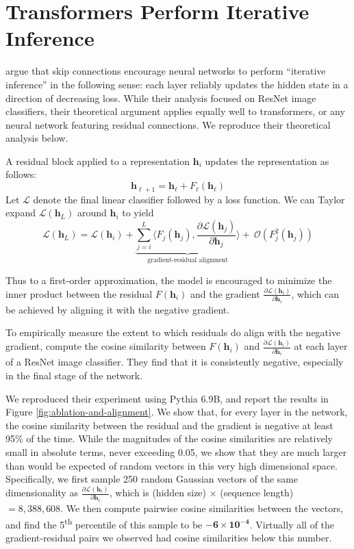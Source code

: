\documentclass{article}
\theoremstyle{plain}
\theoremstyle{definition}
\newcommand{\hh}{\boldsymbol h} %
\begin{document}
\section{Transformers Perform Iterative Inference}
\label{app:iterative-inference}

\citet{jastrzkebski2017residual} argue that skip connections encourage neural networks to perform ``iterative inference'' in the following sense: each layer reliably updates the hidden state in a direction of decreasing loss. While their analysis focused on ResNet image classifiers, their theoretical argument applies equally well to transformers, or any neural network featuring residual connections. We reproduce their theoretical analysis below.

A residual block applied to a representation $ \hh_{i} $ updates the representation as follows:
\begin{equation*}
 \hh_{\ell+1}  = \hh_{\ell} + F_{\ell}(\hh_{\ell})
\end{equation*}
Let $\mathcal{L}$ denote the final linear classifier followed by a loss function. We can Taylor expand $\mathcal{L}(\hh_L)$ around $\hh_i$ to yield
\begin{equation}
    \mathcal{L}(\hh_L) = \mathcal{L}(\hh_{i}) + \underbrace{\sum_{j=i}^{L} \Big\langle F_{j}(\hh_{j}), \frac{\partial \mathcal{L}(\hh_{j})}{\partial \hh_{j}} \Big\rangle}_{\textrm{gradient-residual alignment}} +\:\mathcal{O}(F_{j}^{2}(\hh_{j}))
\end{equation}

Thus to a first-order approximation, the model is encouraged to minimize the inner product between the residual $F(\hh_{i})$ and the gradient $ \frac{\partial \mathcal{L}(\hh_{i})}{\partial \hh_{i}}  $, which can be achieved by aligning it with the negative gradient.

To empirically measure the extent to which residuals do align with the negative gradient, \citet{jastrzkebski2017residual} compute the cosine similarity between $ F(\hh_{i}) $ and $ \frac{\partial \mathcal{L}(\hh_{i})}{\partial \hh_{i}}  $ at each layer of a ResNet image classifier. They find that it is consistently negative, especially in the final stage of the network.

We reproduced their experiment using Pythia 6.9B, and report the results in Figure \ref{fig:ablation-and-alignment}. We show that, for every layer in the network, the cosine similarity between the residual and the gradient is negative at least 95\% of the time. While the magnitudes of the cosine similarities are relatively small in absolute terms, never exceeding 0.05, we show that they are much larger than would be expected of random vectors in this very high dimensional space. Specifically, we first sample 250 random Gaussian vectors of the same dimensionality as $ \frac{\partial \mathcal{L}(\hh_{i})}{\partial \hh_{i}}  $, which is (hidden size) $\times$ (sequence length) $ = 8{,}388{,}608$. We then compute pairwise cosine similarities between the vectors, and find the 5\textsuperscript{th} percentile of this sample to be $\mathbf{-6 \times 10^{-4}}$. Virtually all of the gradient-residual pairs we observed had cosine similarities below this number.
\end{document}

